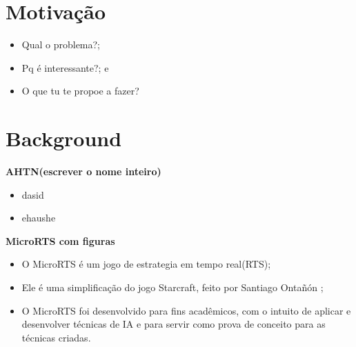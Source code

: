 \documentclass[a0,portrait]{a0poster}
\begin{document}

\begin{multicols}{2} 
\color{NavyBlue}
\color{Black}
\raggedright
\Large

\newcommand\itemadjust{\itemsep.5em \parskip0pt \parsep0pt}
\color{NavyBlue}
\section*{\huge Motiva\c{c}\~ao}
\color{Black}

\begin{itemize}
	\item Qual o problema?;
	\item Pq é interessante?; e
	\item O que tu te propoe a fazer?
\end{itemize}

\color{NavyBlue}
\section*{\huge Background}
\color{Black}

\textbf{AHTN(escrever o nome inteiro)}

\begin{itemize}
	\item dasid
	\item ehaushe
\end{itemize}

\vspace{10mm}
\textbf{MicroRTS com figuras}


\begin{itemize}
	\item O MicroRTS é um jogo de estrategia em tempo real(RTS);
	\item Ele é uma simplificação do jogo Starcraft, feito por Santiago Ontañón \cite{ontanon2013combinatorial};
	\item O MicroRTS foi desenvolvido para fins acadêmicos, com o intuito de aplicar e desenvolver técnicas de IA e para servir como prova de conceito para as técnicas criadas.
\end{itemize}


\end{multicols}
\end{document}

